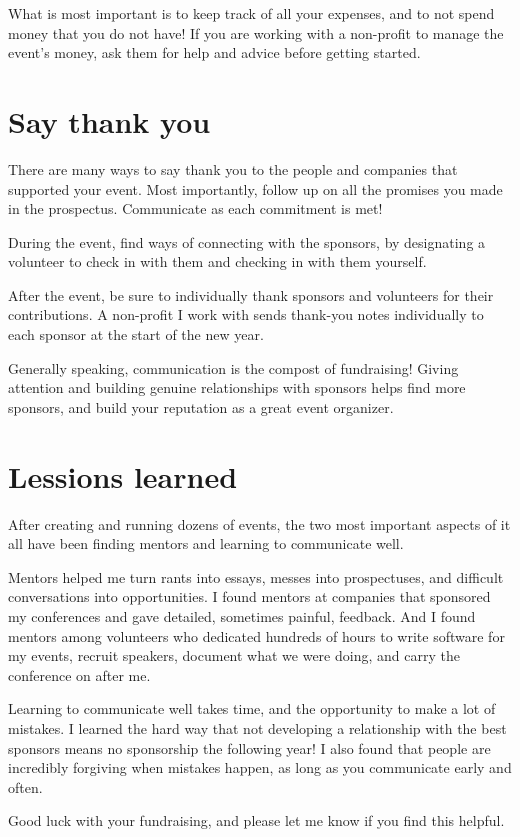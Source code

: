 What is most important is to keep track of all your expenses, and to not spend
money that you do not have! If you are working with a non-profit to manage the
event’s money, ask them for help and advice before getting started.

\section*{Say thank you}
There are many ways to say thank you to the people and companies that supported
your event. Most importantly, follow up on all the promises you made in the
prospectus. Communicate as each commitment is met!

During the event, find ways of connecting with the sponsors, by designating a
volunteer to check in with them and checking in with them yourself.

After the event, be sure to individually thank sponsors and volunteers for their
contributions. A non-profit I work with sends thank-you notes individually to
each sponsor at the start of the new year.

Generally speaking, communication is the compost of fundraising! Giving
attention and building genuine relationships with sponsors helps find more
sponsors, and build your reputation as a great event organizer.

\section*{Lessions learned}
After creating and running dozens of events, the two most important aspects of
it all have been finding mentors and learning to communicate well. 

Mentors helped me turn rants into essays, messes into prospectuses, and
difficult conversations into opportunities. I found mentors at companies that
sponsored my conferences and gave detailed, sometimes painful, feedback. And I
found mentors among volunteers who dedicated hundreds of hours to write software
for my events, recruit speakers, document what we were doing, and carry the
conference on after me. 

Learning to communicate well takes time, and the opportunity to make a lot of
mistakes. I learned the hard way that not developing a relationship with the
best sponsors means no sponsorship the following year! I also found that people
are incredibly forgiving when mistakes happen, as long as you communicate early
and often.

Good luck with your fundraising, and please let me know if you find this
helpful.
